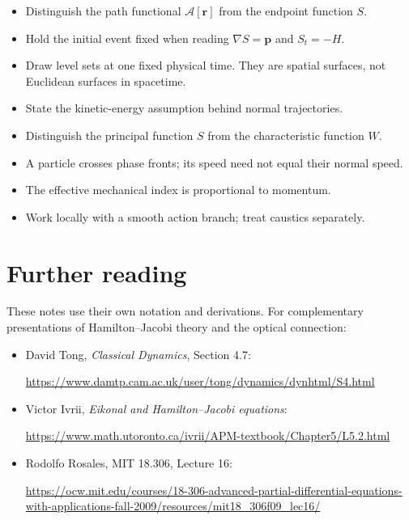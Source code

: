 \documentclass[11pt,a4paper]{article}
\newcommand{\A}{\mathcal{A}}
\newcommand{\vr}{\mathbf{r}}
\newcommand{\vp}{\mathbf{p}}
\begin{document}
\begin{itemize}
\item
Distinguish the path functional \(\A[\vr]\)
from the endpoint function \(S\).

\item
Hold the initial event fixed when reading
\(\nabla S=\vp\) and \(S_t=-H\).

\item
Draw level sets at one fixed physical time.
They are spatial surfaces, not Euclidean surfaces
in spacetime.

\item
State the kinetic-energy assumption behind normal
trajectories.

\item
Distinguish the principal function \(S\)
from the characteristic function \(W\).

\item
A particle crosses phase fronts; its speed need not
equal their normal speed.

\item
The effective mechanical index is proportional
to momentum.

\item
Work locally with a smooth action branch;
treat caustics separately.
\end{itemize}

\section*{Further reading}

These notes use their own notation and derivations.
For complementary presentations of Hamilton--Jacobi
theory and the optical connection:

\begin{itemize}
\item
David Tong, \emph{Classical Dynamics}, Section 4.7:

\url{https://www.damtp.cam.ac.uk/user/tong/dynamics/dynhtml/S4.html}

\item
Victor Ivrii,
\emph{Eikonal and Hamilton--Jacobi equations}:

\url{https://www.math.utoronto.ca/ivrii/APM-textbook/Chapter5/L5.2.html}

\item
Rodolfo Rosales, MIT 18.306, Lecture 16:

\url{https://ocw.mit.edu/courses/18-306-advanced-partial-differential-equations-with-applications-fall-2009/resources/mit18_306f09_lec16/}
\end{itemize}
\end{document}

